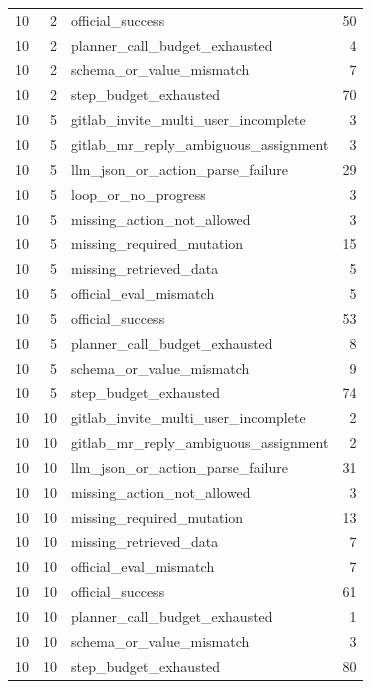 \begin{tabular}{rrlr}
10 & 2 & official_success & 50 \\
10 & 2 & planner_call_budget_exhausted & 4 \\
10 & 2 & schema_or_value_mismatch & 7 \\
10 & 2 & step_budget_exhausted & 70 \\
10 & 5 & gitlab_invite_multi_user_incomplete & 3 \\
10 & 5 & gitlab_mr_reply_ambiguous_assignment & 3 \\
10 & 5 & llm_json_or_action_parse_failure & 29 \\
10 & 5 & loop_or_no_progress & 3 \\
10 & 5 & missing_action_not_allowed & 3 \\
10 & 5 & missing_required_mutation & 15 \\
10 & 5 & missing_retrieved_data & 5 \\
10 & 5 & official_eval_mismatch & 5 \\
10 & 5 & official_success & 53 \\
10 & 5 & planner_call_budget_exhausted & 8 \\
10 & 5 & schema_or_value_mismatch & 9 \\
10 & 5 & step_budget_exhausted & 74 \\
10 & 10 & gitlab_invite_multi_user_incomplete & 2 \\
10 & 10 & gitlab_mr_reply_ambiguous_assignment & 2 \\
10 & 10 & llm_json_or_action_parse_failure & 31 \\
10 & 10 & missing_action_not_allowed & 3 \\
10 & 10 & missing_required_mutation & 13 \\
10 & 10 & missing_retrieved_data & 7 \\
10 & 10 & official_eval_mismatch & 7 \\
10 & 10 & official_success & 61 \\
10 & 10 & planner_call_budget_exhausted & 1 \\
10 & 10 & schema_or_value_mismatch & 3 \\
10 & 10 & step_budget_exhausted & 80 \\
\bottomrule
\end{tabular}
